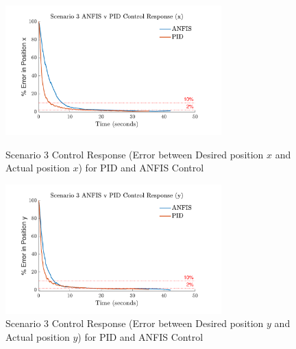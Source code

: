 \begin{figure}[H]
    \centering
    \begin{minipage}[b]{0.45\textwidth}
        \centering
        \includegraphics[height=5cm,keepaspectratio]{img/Scenario 3 Error in x Position.pdf}
        \caption{Scenario 3 Control Response (Error between Desired position $x$ and Actual position $x$) for PID and ANFIS Control}
        \label{fig:Response3x}
    \end{minipage}
    \hfill
    \begin{minipage}[b]{0.45\textwidth}
        \centering
        \includegraphics[height=5cm,keepaspectratio]{img/Scenario 3 Error in y Position.pdf}
        \caption{Scenario 3 Control Response (Error between Desired position $y$ and Actual position $y$) for PID and ANFIS Control}
        \label{fig:Response3y}
    \end{minipage}
\end{figure}

